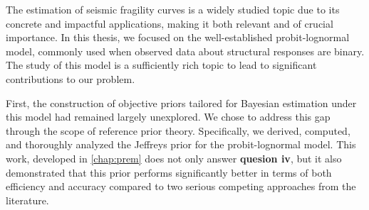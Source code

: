 




The estimation of seismic fragility curves is a widely studied topic due to its concrete and impactful applications, making it both relevant and of crucial importance.
In this thesis, we focused on the well-established probit-lognormal model, commonly used when observed data about structural responses are binary. The study of this model %
is a sufficiently rich topic to lead to significant contributions to our problem.


First, the construction of objective priors tailored
for Bayesian estimation under this model had remained largely unexplored. We chose to address this gap through the scope of reference prior theory. Specifically, we derived, computed, and thoroughly analyzed the Jeffreys prior for the probit-lognormal model. This work, developed in \cref{chap:prem} does not only answer \textbf{quesion iv}, but it also demonstrated that this prior performs significantly better in terms of both efficiency and accuracy compared to two serious competing approaches from the literature.

